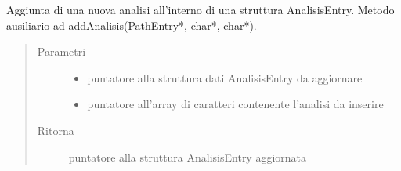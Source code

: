 \documentclass[letterpaper,10pt,italian,openany,oneside]{sphinxmanual}
\begin{document}

\begin{fulllineitems}
\label{\detokenize{code/datastructure:c.addAnalisisByAnalisisEntry}}
Aggiunta di una nuova analisi all’interno di una struttura AnalisisEntry.
Metodo ausiliario ad addAnalisis(PathEntry*, char*, char*).
\begin{quote}\begin{description}
\item[{Parametri}] \leavevmode\begin{itemize}
\item {} 
 \textendash{} puntatore alla struttura dati AnalisisEntry da aggiornare

\item {} 
 \textendash{} puntatore all’array di caratteri contenente l’analisi da inserire

\end{itemize}

\item[{Ritorna}] \leavevmode
puntatore alla struttura AnalisisEntry aggiornata

\end{description}\end{quote}

\end{fulllineitems}

\end{document}
